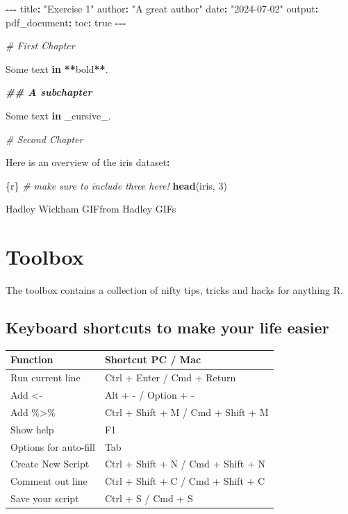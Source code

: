 \documentclass[
]{book}
\newenvironment{Shaded}{\begin{snugshade}}{\end{snugshade}}
\newcommand{\CommentTok}[1]{\textcolor[rgb]{0.56,0.35,0.01}{\textit{#1}}}
\newcommand{\ControlFlowTok}[1]{\textcolor[rgb]{0.13,0.29,0.53}{\textbf{#1}}}
\newcommand{\DecValTok}[1]{\textcolor[rgb]{0.00,0.00,0.81}{#1}}
\newcommand{\DocumentationTok}[1]{\textcolor[rgb]{0.56,0.35,0.01}{\textbf{\textit{#1}}}}
\newcommand{\FunctionTok}[1]{\textcolor[rgb]{0.13,0.29,0.53}{\textbf{#1}}}
\newcommand{\NormalTok}[1]{#1}
\newcommand{\SpecialCharTok}[1]{\textcolor[rgb]{0.81,0.36,0.00}{\textbf{#1}}}
\newcommand{\StringTok}[1]{\textcolor[rgb]{0.31,0.60,0.02}{#1}}
\begin{document}
\begin{Shaded}
\begin{Highlighting}[]
\SpecialCharTok{{-}{-}{-}}
\NormalTok{title}\SpecialCharTok{:} \StringTok{"Exercise 1"}
\NormalTok{author}\SpecialCharTok{:} \StringTok{"A great author"}
\NormalTok{date}\SpecialCharTok{:} \StringTok{"2024{-}07{-}02"}
\NormalTok{output}\SpecialCharTok{:} 
\NormalTok{  pdf\_document}\SpecialCharTok{:}
\NormalTok{    toc}\SpecialCharTok{:}\NormalTok{ true}
\SpecialCharTok{{-}{-}{-}}

\CommentTok{\# First Chapter}

\NormalTok{Some text }\ControlFlowTok{in} \SpecialCharTok{**}\NormalTok{bold}\SpecialCharTok{**}\NormalTok{.}

\DocumentationTok{\#\# A subchapter}

\NormalTok{Some text }\ControlFlowTok{in}\NormalTok{ \_cursive\_.}

\CommentTok{\# Second Chapter}

\NormalTok{Here is an overview of the iris dataset}\SpecialCharTok{:}

\StringTok{\textasciigrave{}\textasciigrave{}}\NormalTok{\{r\} }\CommentTok{\# make sure to include three \textasciigrave{} here!}
\FunctionTok{head}\NormalTok{(iris, }\DecValTok{3}\NormalTok{)}
\StringTok{\textasciigrave{}\textasciigrave{}}
\end{Highlighting}
\end{Shaded}

Hadley Wickham GIFfrom Hadley GIFs

\chapter*{Toolbox}\label{toolbox}

The toolbox contains a collection of nifty tips, tricks and hacks for anything R.

\section*{Keyboard shortcuts to make your life easier}\label{shortcuts}

\begin{longtable}[]{@{}ll@{}}
\toprule\noalign{}
Function & Shortcut PC / Mac \\
\midrule\noalign{}
\endhead
\bottomrule\noalign{}
\endlastfoot
Run current line & Ctrl + Enter / Cmd + Return \\
Add \textless- & Alt + - / Option + - \\
Add \%\textgreater\% & Ctrl + Shift + M / Cmd + Shift + M \\
Show help & F1 \\
Options for auto-fill & Tab \\
Create New Script & Ctrl + Shift + N / Cmd + Shift + N \\
Comment out line & Ctrl + Shift + C / Cmd + Shift + C \\
Save your script & Ctrl + S / Cmd + S \\
\end{longtable}
\end{document}

